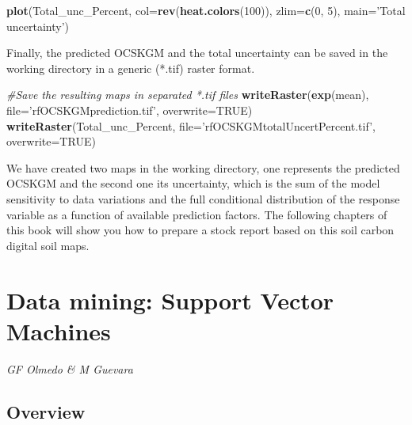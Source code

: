\documentclass[10pt,b5paper,]{book}
\newenvironment{Shaded}{\begin{snugshade}}{\end{snugshade}}
\newcommand{\CommentTok}[1]{\textcolor[rgb]{0.56,0.35,0.01}{\textit{#1}}}
\newcommand{\DataTypeTok}[1]{\textcolor[rgb]{0.13,0.29,0.53}{#1}}
\newcommand{\DecValTok}[1]{\textcolor[rgb]{0.00,0.00,0.81}{#1}}
\newcommand{\KeywordTok}[1]{\textcolor[rgb]{0.13,0.29,0.53}{\textbf{#1}}}
\newcommand{\NormalTok}[1]{#1}
\newcommand{\OtherTok}[1]{\textcolor[rgb]{0.56,0.35,0.01}{#1}}
\newcommand{\StringTok}[1]{\textcolor[rgb]{0.31,0.60,0.02}{#1}}
\theoremstyle{definition}
\theoremstyle{definition}
\theoremstyle{definition}
\theoremstyle{remark}
\begin{document}
\begin{Shaded}
\begin{Highlighting}[]
\KeywordTok{plot}\NormalTok{(Total_unc_Percent, }\DataTypeTok{col=}\KeywordTok{rev}\NormalTok{(}\KeywordTok{heat.colors}\NormalTok{(}\DecValTok{100}\NormalTok{)), }\DataTypeTok{zlim=}\KeywordTok{c}\NormalTok{(}\DecValTok{0}\NormalTok{, }\DecValTok{5}\NormalTok{), }
     \DataTypeTok{main=}\StringTok{'Total uncertainty'}\NormalTok{)}
\end{Highlighting}
\end{Shaded}

Finally, the predicted OCSKGM and the total uncertainty can be saved in
the working directory in a generic (*.tif) raster format.

\begin{Shaded}
\begin{Highlighting}[]
\CommentTok{#Save the resulting maps in separated *.tif files}
\KeywordTok{writeRaster}\NormalTok{(}\KeywordTok{exp}\NormalTok{(mean), }\DataTypeTok{file=}\StringTok{'rfOCSKGMprediction.tif'}\NormalTok{, }
            \DataTypeTok{overwrite=}\OtherTok{TRUE}\NormalTok{)}
\KeywordTok{writeRaster}\NormalTok{(Total_unc_Percent, }\DataTypeTok{file=}\StringTok{'rfOCSKGMtotalUncertPercent.tif'}\NormalTok{,}
            \DataTypeTok{overwrite=}\OtherTok{TRUE}\NormalTok{)}
\end{Highlighting}
\end{Shaded}

We have created two maps in the working directory, one represents the
predicted OCSKGM and the second one its uncertainty, which is the sum of
the model sensitivity to data variations and the full conditional
distribution of the response variable as a function of available
prediction factors. The following chapters of this book will show you
how to prepare a stock report based on this soil carbon digital soil
maps.

\clearpage

\hypertarget{svm}{%
\section{Data mining: Support Vector Machines}\label{svm}}

\emph{GF Olmedo \& M Guevara}

\hypertarget{overview-3}{%
\subsection{Overview}\label{overview-3}}
\end{document}
